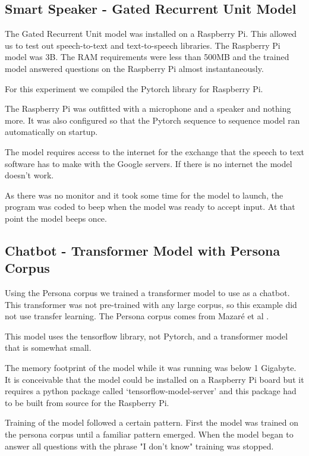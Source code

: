 \subsection{Smart Speaker - Gated Recurrent Unit Model}

The Gated Recurrent Unit model was installed on a Raspberry Pi. This allowed us to test out speech-to-text and text-to-speech libraries. The Raspberry Pi model was 3B. The RAM requirements were less than 500MB and the trained model answered questions on the Raspberry Pi almost instantaneously.

For this experiment we compiled the Pytorch library for Raspberry Pi.

The Raspberry Pi was outfitted with a microphone and a speaker and nothing more. It was also configured so that the Pytorch sequence to sequence model ran automatically on startup.

The model requires access to the internet for the exchange that the speech to text software has to make with the Google servers. If there is no internet the model doesn't work.

As there was no monitor and it took some time for the model to launch, the program was coded to beep when the model was ready to accept input. At that point the model beeps once.

\subsection{Chatbot - Transformer Model with Persona Corpus}
Using the Persona corpus we trained a transformer model to use as a chatbot. This transformer was not pre-trained with any large corpus, so this example did not use transfer learning. The Persona corpus comes from Mazar{\'{e}} et al \cite{DBLP:journals/corr/abs-1809-01984}.

This model uses the tensorflow library, not Pytorch, and a transformer model that is somewhat small.

The memory footprint of the model while it was running was below 1 Gigabyte. It is conceivable that the model could be installed on a Raspberry Pi board but it requires a python package called `tensorflow-model-server' and this package had to be built from source for the Raspberry Pi. 

Training of the model followed a certain pattern. First the model was trained on the persona corpus until a familiar pattern emerged. When the model began to answer all questions with the 
phrase "I don't know" training was stopped. 

